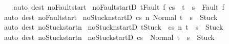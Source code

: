 \begin{isabellebody}
%
\isadelimproof
\ \ %
\endisadelimproof
%
\isatagproof
{}\isamarkupfalse%
\ {\isacharparenleft}auto\ dest{\isacharcolon}\ noFault{\isacharunderscore}start{\isacharparenright}%
\endisatagproof
{\isafoldproof}%
%
\isadelimproof
\isanewline
%
\endisadelimproof
\isanewline
{}\isamarkupfalse%
\ noFault{\isacharunderscore}startD{\isacharprime}{\isacharcolon}\ {\isachardoublequoteopen}t{\isasymnoteq}Fault\ f{\isasymLongrightarrow}\ {\isasymGamma}{\isasymturnstile}{\isasymlangle}c{\isacharcomma}s{\isasymrangle}\ {\isasymRightarrow}\ t\ {\isasymLongrightarrow}\ s\ {\isasymnoteq}\ Fault\ f{\isachardoublequoteclose}\isanewline
%
\isadelimproof
\ \ %
\endisadelimproof
%
\isatagproof
{}\isamarkupfalse%
\ {\isacharparenleft}auto\ dest{\isacharcolon}\ noFault{\isacharunderscore}start{\isacharparenright}%
\endisatagproof
{\isafoldproof}%
%
\isadelimproof
\isanewline
%
\endisadelimproof
\isanewline
{}\isamarkupfalse%
\ noStuckn{\isacharunderscore}startD{\isacharcolon}\ {\isachardoublequoteopen}{\isasymGamma}{\isasymturnstile}{\isasymlangle}c{\isacharcomma}s{\isasymrangle}\ {\isacharequal}n{\isasymRightarrow}\ Normal\ t\ {\isasymLongrightarrow}\ s\ {\isasymnoteq}\ Stuck{\isachardoublequoteclose}\isanewline
%
\isadelimproof
\ \ %
\endisadelimproof
%
\isatagproof
{}\isamarkupfalse%
\ {\isacharparenleft}auto\ dest{\isacharcolon}\ noStuck{\isacharunderscore}startn{\isacharparenright}%
\endisatagproof
{\isafoldproof}%
%
\isadelimproof
\isanewline
%
\endisadelimproof
\isanewline
{}\isamarkupfalse%
\ noStuckn{\isacharunderscore}startD{\isacharprime}{\isacharcolon}\ {\isachardoublequoteopen}t{\isasymnoteq}Stuck\ {\isasymLongrightarrow}\ {\isasymGamma}{\isasymturnstile}{\isasymlangle}c{\isacharcomma}s{\isasymrangle}\ {\isacharequal}n{\isasymRightarrow}\ t\ {\isasymLongrightarrow}\ s\ {\isasymnoteq}\ Stuck{\isachardoublequoteclose}\isanewline
%
\isadelimproof
\ \ %
\endisadelimproof
%
\isatagproof
{}\isamarkupfalse%
\ {\isacharparenleft}auto\ dest{\isacharcolon}\ noStuck{\isacharunderscore}startn{\isacharparenright}%
\endisatagproof
{\isafoldproof}%
%
\isadelimproof
\isanewline
%
\endisadelimproof
\isanewline
{}\isamarkupfalse%
\ noStuck{\isacharunderscore}startD{\isacharcolon}\ {\isachardoublequoteopen}{\isasymGamma}{\isasymturnstile}{\isasymlangle}c{\isacharcomma}s{\isasymrangle}\ {\isasymRightarrow}\ Normal\ t\ {\isasymLongrightarrow}\ s\ {\isasymnoteq}\ Stuck{\isachardoublequoteclose}\isanewline
%
\isadelimproof
\ \ %
\endisadelimproof
%
\isatagproof
{}\isamarkupfalse%

\end{isabellebody}
